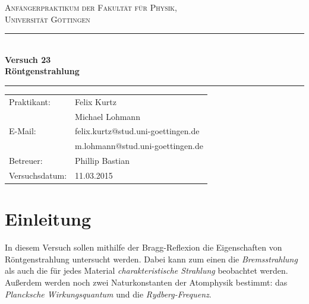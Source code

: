 \documentclass[12pt,a4paper,titlepage,headinclude,bibtotoc]{scrartcl}
\begin{document}
\begin{titlepage}
\centering
\textsc{\Large Anfängerpraktikum der Fakultät für
  Physik,\\[1.5ex] Universität Göttingen}

\vspace*{4.2cm}

\rule{\textwidth}{1pt}\\[0.5cm]
{\huge \bfseries
  Versuch 23\\[1.5ex]
  Röntgenstrahlung}\\[0.5cm]
\rule{\textwidth}{1pt}

\vspace*{3.0cm}

\begin{Large}
\begin{tabular}{ll}
Praktikant:
 	&  Felix Kurtz\\
 	&  Michael Lohmann\\

E-Mail: 
	&  felix.kurtz@stud.uni-goettingen.de\\
	& m.lohmann@stud.uni-goettingen.de\\

 Betreuer: & Phillip Bastian\\
 Versuchsdatum: &  11.03.2015\\
\end{tabular}
\end{Large}

\vspace*{0.8cm}

\begin{Large}
\end{Large}

\end{titlepage}

\tableofcontents

\newpage

\section{Einleitung}
\label{sec:einleitung}
In diesem Versuch sollen mithilfe der Bragg-Reflexion die Eigenschaften von Röntgenstrahlung untersucht werden.
Dabei kann zum einen die \emph{Bremsstrahlung} als auch die für jedes Material \emph{charakteristische Strahlung} beobachtet werden.
Außerdem werden noch zwei Naturkonstanten der Atomphysik bestimmt: das \emph{Plancksche Wirkungsquantum} und die \emph{Rydberg-Frequenz}.
\end{document}
